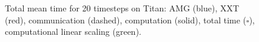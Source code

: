 \documentclass{sig-alternate}
\begin{document}
\begin{figure}
{  }
\caption{Total mean time for 20 timesteps on Titan: AMG ({\color{blue}blue}), XXT ({\color{red}red}), communication (dashed),
  computation (solid),  total time ($\square$), computational linear scaling
  ({\color{green}green}).}
\label{fig:scaling_titan}
\end{figure}
\end{document}
